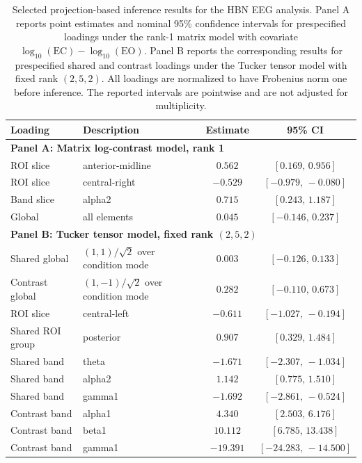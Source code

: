 \begin{table}[htbp]
	\centering
	\caption{Selected projection-based inference results for the HBN EEG analysis. Panel A reports point estimates and nominal 95\% confidence intervals for prespecified loadings under the rank-1 matrix model with covariate $\log_{10}(\mathrm{EC})-\log_{10}(\mathrm{EO})$. Panel B reports the corresponding results for prespecified shared and contrast loadings under the Tucker tensor model with fixed rank $(2,5,2)$. All loadings are normalized to have Frobenius norm one before inference. The reported intervals are pointwise and are not adjusted for multiplicity.}
	\label{tab:realdata-infer}
	\begin{threeparttable}
		\small
		\begin{tabular}{llcc}
			\toprule
			Loading & Description & Estimate & 95\% CI \\
			\midrule
			\multicolumn{4}{l}{\textbf{Panel A: Matrix log-contrast model, rank 1}} \\
			ROI slice & anterior-midline & $0.562$ & $[0.169,\,0.956]$ \\
			ROI slice & central-right & $-0.529$ & $[-0.979,\,-0.080]$ \\
			Band slice & alpha2 & $0.715$ & $[0.243,\,1.187]$ \\
			Global & all elements & $0.045$ & $[-0.146,\,0.237]$ \\
			\midrule
			\multicolumn{4}{l}{\textbf{Panel B: Tucker tensor model, fixed rank $(2,5,2)$}} \\
			Shared global & $(1,1)/\sqrt{2}$ over condition mode & $0.003$ & $[-0.126,\,0.133]$ \\
			Contrast global & $(1,-1)/\sqrt{2}$ over condition mode & $0.282$ & $[-0.110,\,0.673]$ \\
			ROI slice & central-left & $-0.611$ & $[-1.027,\,-0.194]$ \\
			Shared ROI group & posterior & $0.907$ & $[0.329,\,1.484]$ \\
			Shared band & theta & $-1.671$ & $[-2.307,\,-1.034]$ \\
			Shared band & alpha2 & $1.142$ & $[0.775,\,1.510]$ \\
			Shared band & gamma1 & $-1.692$ & $[-2.861,\,-0.524]$ \\
			Contrast band & alpha1 & $4.340$ & $[2.503,\,6.176]$ \\
			Contrast band & beta1 & $10.112$ & $[6.785,\,13.438]$ \\
			Contrast band & gamma1 & $-19.391$ & $[-24.283,\,-14.500]$ \\
			\bottomrule
		\end{tabular}
	\end{threeparttable}
\end{table}
